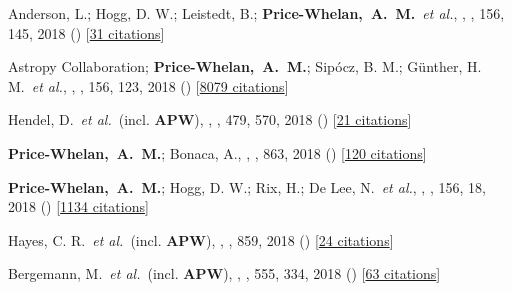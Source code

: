 \item[{\color{deemph}\scriptsize44}]Anderson, L.; Hogg, D. W.; Leistedt, B.; \textbf{Price-Whelan,~A.~M.}~\textit{et al.}, , \aj, 156, 145, 2018 () [\href{http://adsabs.harvard.edu/abs/2018AJ....156..145A}{31 citations}]

\item[{\color{deemph}\scriptsize43}]Astropy Collaboration; \textbf{Price-Whelan,~A.~M.}; Sip{\'{o}}cz, B. M.; G{\"u}nther, H. M.~\textit{et al.}, , \aj, 156, 123, 2018 () [\href{http://adsabs.harvard.edu/abs/2018AJ....156..123A}{8079 citations}]

\item[{\color{deemph}\scriptsize42}]Hendel, D.~\textit{et al.}~(incl. \textbf{APW}), , \mnras, 479, 570, 2018 () [\href{http://adsabs.harvard.edu/abs/2018MNRAS.479..570H}{21 citations}]

\item[{\color{deemph}\scriptsize41}]\textbf{Price-Whelan,~A.~M.}; Bonaca, A., , \apj, 863, 2018 () [\href{http://adsabs.harvard.edu/abs/2018ApJ...863L..20P}{120 citations}]

\item[{\color{deemph}\scriptsize40}]\textbf{Price-Whelan,~A.~M.}; Hogg, D. W.; Rix, H.; De Lee, N.~\textit{et al.}, , \aj, 156, 18, 2018 () [\href{http://adsabs.harvard.edu/abs/2018AJ....156...18P}{1134 citations}]

\item[{\color{deemph}\scriptsize39}]Hayes, C. R.~\textit{et al.}~(incl. \textbf{APW}), , \apj, 859, 2018 () [\href{http://adsabs.harvard.edu/abs/2018ApJ...859L...8H}{24 citations}]

\item[{\color{deemph}\scriptsize38}]Bergemann, M.~\textit{et al.}~(incl. \textbf{APW}), , \nature, 555, 334, 2018 () [\href{http://adsabs.harvard.edu/abs/2018Natur.555..334B}{63 citations}]

